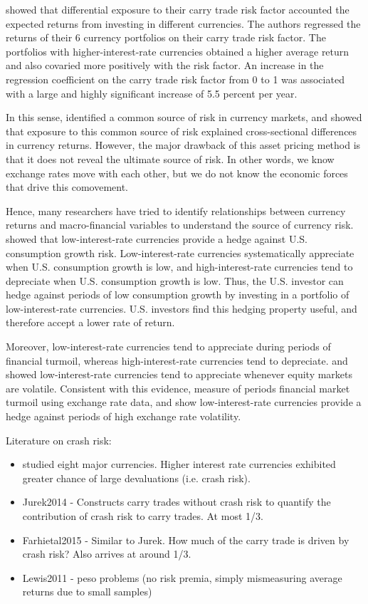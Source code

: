 \citet{LustigRoussanovVerdelhan2011} showed that differential exposure
to their carry trade risk factor accounted the expected returns from
investing in different currencies. The authors regressed the returns
of their 6 currency portfolios on their carry trade risk factor. The
portfolios with higher-interest-rate currencies obtained a higher
average return and also covaried more positively with the risk factor.
An increase in the regression coefficient on the carry trade risk
factor from 0 to 1 was associated with a large and highly significant
increase of 5.5 percent per year.

In this sense, \citet{LustigRoussanovVerdelhan2011} identified a
common source of risk in currency markets, and showed that exposure to
this common source of risk explained cross-sectional differences in
currency returns. However, the major drawback of this asset pricing
method is that it does not reveal the ultimate source of risk. In
other words, we know exchange rates move with each other, but we do
not know the economic forces that drive this comovement.

Hence, many researchers have tried to identify relationships between
currency returns and macro-financial variables to understand the
source of currency risk. \citet{LustigVerdelhan2007} showed that
low-interest-rate currencies provide a hedge against U.S. consumption
growth risk. Low-interest-rate currencies systematically appreciate
when U.S. consumption growth is low, and high-interest-rate currencies
tend to depreciate when U.S. consumption growth is low. Thus, the U.S.
investor can hedge against periods of low consumption growth by
investing in a portfolio of low-interest-rate currencies. U.S.
investors find this hedging property useful, and therefore accept a
lower rate of return.

Moreover, low-interest-rate currencies tend to appreciate during
periods of financial turmoil, whereas high-interest-rate currencies
tend to depreciate. \citet{LustigRoussanovVerdelhan2011} and
\citet{CampbellMedeirosViceira2010} showed low-interest-rate
currencies tend to appreciate whenever equity markets are volatile.
Consistent with this evidence, \citet{Menkhoffetal2012} measure of
periods financial market turmoil using exchange rate data, and show
low-interest-rate currencies provide a hedge against periods of high
exchange rate volatility.

Literature on crash risk:
\begin{itemize}
\item \citet{Brunnermeieretal2009} studied eight major currencies.
  Higher interest rate currencies exhibited greater chance of large
  devaluations (i.e. crash risk).
\item Jurek2014 - Constructs carry trades without crash risk to
  quantify the contribution of crash risk to carry trades. At most
  1/3.
\item Farhietal2015 - Similar to Jurek. How much of the carry trade is
  driven by crash risk? Also arrives at around 1/3.
\item Lewis2011 - peso problems (no risk premia, simply mismeasuring
  average returns due to small samples)
\end{itemize}

